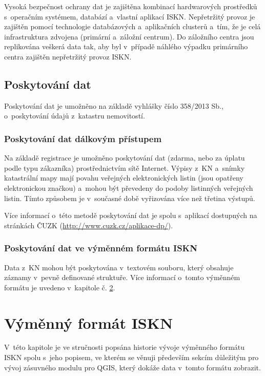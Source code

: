 \documentclass[a4paper,12pt,oneside]{book}
\begin{document}
Vysoká bezpečnost ochrany dat je zajištěna kombinací hardwarových
prostředků s~operačním systémem, databází a~vlastní aplikací
ISKN. Nepřetržitý provoz je zajištěn pomocí technologie databázových
a~aplikačních clusterů a~tím, že je celá infrastruktura zdvojena
(primární a~záložní centrum). Do záložního centra jsou replikována
veškerá data tak, aby byl v~případě náhlého výpadku primárního centra
zajištěn nepřetržitý provoz ISKN. \cite{iskn}


\section{Poskytování dat}

Poskytování dat je umožněno na základě vyhlášky číslo 358/2013 Sb.,
o~poskytování údajů z~katastru nemovitostí. \cite{iskn}

\subsection{Poskytování dat dálkovým přístupem}

Na základě registrace je umožněno poskytování dat (zdarma, nebo za
úplatu podle typu zákazníka) prostřednictvím sítě Internet. Výpisy
z~KN a~snímky katastrální mapy mají povahu veřejných elektronických
listin (jsou opatřeny elektronickou značkou) a~mohou být převedeny do
podoby listinných veřejných listin. Tímto způsobem je v~současné době
vyřizována více než třetina výstupů. \cite{iskn}

Více informací o~této metodě poskytování dat je spolu s~aplikací
dostupných na stránkách ČUZK (\url{http://www.cuzk.cz/aplikace-dp/}).

\subsection{Poskytování dat ve výměnném formátu ISKN}

Data z~KN mohou být poskytována v~textovém souboru, který obsahuje
záznamy v~pevně definované struktuře. Více informací o~tomto výměnném
formátu je uvedeno v~kapitole č. \ref{l_format_vfk}.


\clearpage
\chapter{Výměnný formát ISKN}
\label{l_format_vfk}

V~této kapitole je ve stručnosti popsána historie vývoje výměnného
formátu ISKN spolu s~jeho popisem, ve kterém se věnuji především
sekcím důležitým pro vývoj zásuvného modulu pro QGIS, který dokáže
data v~tomto formátu zobrazit.
\end{document}
